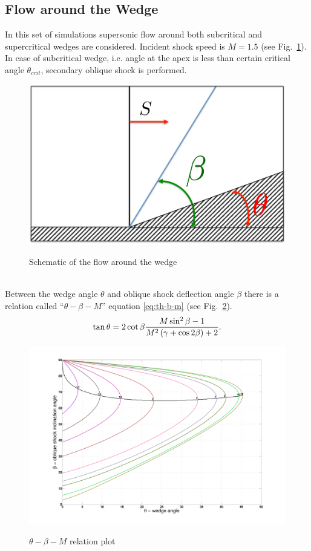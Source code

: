 \subsection{Flow around the Wedge}
In this set of simulations supersonic flow around both subcritical and supercritical wedges are considered. Incident shock speed is $M = 1.5$ (see Fig.~\ref{fig:wedge_scheme}). In case of subcritical wedge, i.e. angle at the apex is less than certain critical angle $\theta_{crit}$, secondary oblique shock is performed. 
\begin{figure}[h!]
\centering \includegraphics[scale=0.6]{fig/wedge_scheme.pdf}\\
\caption{Schematic of the flow around the wedge \label{fig:wedge_scheme}}
\end{figure}\\
Between the wedge angle $\theta$ and oblique shock deflection angle $\beta$ there is a relation called ``$\theta-\beta-M$'' equation \eqref{eq:th-b-m} (see Fig.~\ref{fig:th-b-m}).
\begin{align}
\tan \theta = 2 \cot \beta \frac {M \sin^2 \beta - 1}{M^2 \left(\gamma + \cos 2 \beta\right) + 2}. \label{eq:th-b-m}
\end{align}
\begin{figure}[h!]
\centering \includegraphics[scale=0.2]{fig/th-b-m.pdf}\\
\caption{$\theta-\beta-M$ relation plot \label{fig:th-b-m}}
\end{figure}\\
